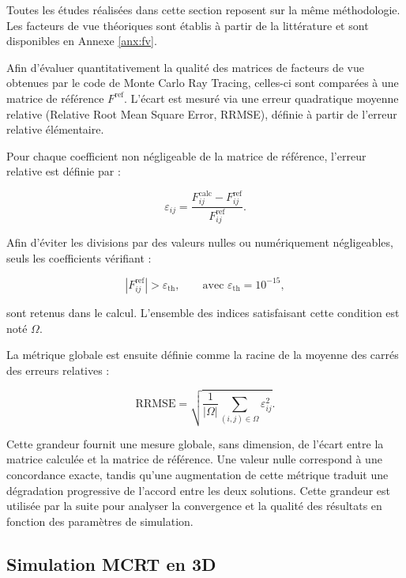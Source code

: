 Toutes les études réalisées dans cette section reposent sur la même méthodologie. Les facteurs de vue théoriques sont établis à partir de la littérature \cite{Howell} et sont disponibles en Annexe \ref{anx:fv}. 

Afin d’évaluer quantitativement la qualité des matrices de facteurs de vue obtenues par le code de Monte Carlo Ray Tracing, celles-ci sont comparées à une matrice de référence $F^{\mathrm{ref}}$. L’écart est mesuré via une erreur quadratique moyenne relative (Relative Root Mean Square Error, RRMSE), définie à partir de l’erreur relative élémentaire.

Pour chaque coefficient non négligeable de la matrice de référence, l’erreur relative est définie par :

\begin{equation}
\varepsilon_{ij} =
\frac{
F_{ij}^{\mathrm{calc}} - F_{ij}^{\mathrm{ref}}
}{
F_{ij}^{\mathrm{ref}}
}.
\end{equation}

Afin d’éviter les divisions par des valeurs nulles ou numériquement négligeables, seuls les coefficients vérifiant :

\begin{equation}
\left|F_{ij}^{\mathrm{ref}}\right| > \varepsilon_{\mathrm{th}},
\qquad \text{avec } \varepsilon_{\mathrm{th}} = 10^{-15},
\end{equation}

sont retenus dans le calcul. L’ensemble des indices satisfaisant cette condition est noté $\Omega$.

La métrique globale est ensuite définie comme la racine de la moyenne des carrés des erreurs relatives :

\begin{equation}
\mathrm{RRMSE}
=
\sqrt{
\frac{1}{|\Omega|}
\sum_{(i,j)\in \Omega}
\varepsilon_{ij}^{2}
}.
\end{equation}

Cette grandeur fournit une mesure globale, sans dimension, de l’écart entre la matrice calculée et la matrice de référence. Une valeur nulle correspond à une concordance exacte, tandis qu’une augmentation de cette métrique traduit une dégradation progressive de l’accord entre les deux solutions. Cette grandeur est utilisée par la suite pour analyser la convergence et la qualité des résultats en fonction des paramètres de simulation.

\subsection{Simulation MCRT en 3D}

